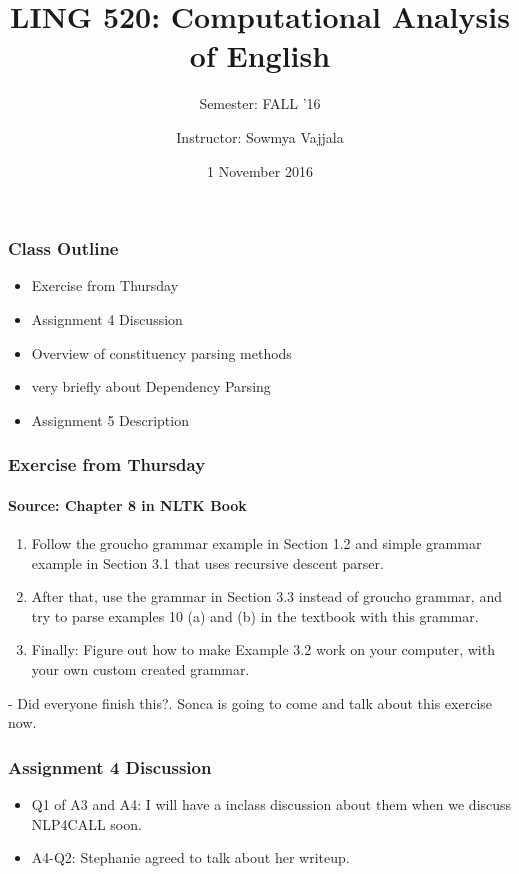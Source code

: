 \documentclass{beamer}
\author[Sowmya Vajjala]{Instructor: Sowmya Vajjala}
\title[LING 520]{LING 520: Computational Analysis of English}
\subtitle{Semester: FALL '16}
\date{1 November 2016}
\institute{Iowa State University, USA}
\begin{document}
\begin{frame}\titlepage
\end{frame}

\begin{frame}
\frametitle{Class Outline}
\begin{itemize}
\item Exercise from Thursday %
\item Assignment 4 Discussion %
\item Overview of constituency parsing methods %
\item very briefly about Dependency Parsing %
\item Assignment 5 Description %
\end{itemize}
\end{frame}

\begin{frame}
\frametitle{Exercise from Thursday}
\framesubtitle{Source: Chapter 8 in NLTK Book}
\begin{enumerate}
\item Follow the groucho grammar example in Section 1.2 and simple grammar example in Section 3.1 that uses recursive descent parser.
\item After that, use the grammar in Section 3.3 instead of groucho grammar, and try to parse examples 10 (a) and (b) in the textbook with this grammar.
\item Finally: Figure out how to make Example 3.2 work on your computer, with your own custom created grammar.
\end{enumerate}
- Did everyone finish this?. \pause Sonca is going to come and talk about this exercise now.  
\end{frame}

\begin{frame}
\frametitle{Assignment 4 Discussion}
\begin{itemize}
\item Q1 of A3 and A4: I will have a inclass discussion about them when we discuss NLP4CALL soon.
\item A4-Q2: Stephanie agreed to talk about her writeup. 
\end{itemize}
\end{frame}
\end{document}
